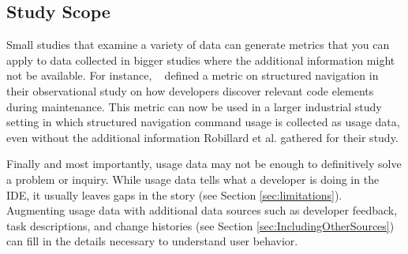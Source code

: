\subsection{Study Scope}

Small studies that examine a variety of data can generate metrics that you can apply to data collected in bigger studies where the additional information might not be available. 
        For instance, ~ defined a metric on structured navigation in their observational study on how developers discover relevant code elements during maintenance. This metric can now be used in a larger industrial study setting in which structured navigation command usage is collected as usage data, even without the additional information Robillard et al. gathered for their study.

Finally and most importantly, usage data may not be enough to definitively solve a problem or inquiry. While usage data tells what a developer is doing in the IDE, it usually leaves gaps in the story (see Section \ref{sec:limitations}).  Augmenting usage data with additional data sources such as developer feedback, task descriptions, and change histories (see Section \ref{sec:IncludingOtherSources}) can fill in the details necessary to understand user behavior.


